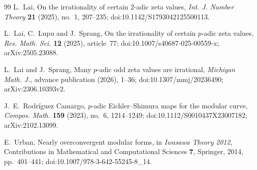 \documentclass[11pt]{article}
\theoremstyle{definition}
\theoremstyle{remark}
\begin{document}
\begin{thebibliography}{99}
L.~Lai,
\newblock On the irrationality of certain $2$-adic zeta values,
\newblock \emph{Int. J. Number Theory} \textbf{21} (2025), no.~1, 207--235;
\newblock doi:10.1142/S1793042125500113.

L.~Lai, C.~Lupu and J.~Sprang,
\newblock On the irrationality of certain $p$-adic zeta values,
\newblock \emph{Res. Math. Sci.} \textbf{12} (2025), article~77;
\newblock doi:10.1007/s40687-025-00559-x; arXiv:2505.23088.

L.~Lai and J.~Sprang,
\newblock Many $p$-adic odd zeta values are irrational,
\newblock \emph{Michigan Math. J.}, advance publication (2026), 1--36;
\newblock doi:10.1307/mmj/20236490; arXiv:2306.10393v2.

J.~E.~Rodr\'iguez Camargo,
\newblock $p$-adic Eichler--Shimura maps for the modular curve,
\newblock \emph{Compos. Math.} \textbf{159} (2023), no.~6, 1214--1249;
\newblock doi:10.1112/S0010437X23007182; arXiv:2102.13099.

E.~Urban,
\newblock Nearly overconvergent modular forms,
\newblock in \emph{Iwasawa Theory 2012}, Contributions in Mathematical and
Computational Sciences \textbf{7}, Springer, 2014, pp.~401--441;
\newblock doi:10.1007/978-3-642-55245-8\_14.

\end{thebibliography}
\end{document}
